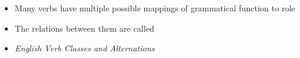 \documentclass[a4paper,landscape,headrule,footrule,xetex]{foils}
\begin{document}


\begin{itemize}
\item  Many verbs have multiple possible mappings of grammatical function to role
  \begin{exe}
    \ex
    \begin{xlist}
      \ex{}
      \ex{}
      \ex{}
    \end{xlist}
    \ex
    \begin{xlist}
      \ex{}
      \ex{}
    \end{xlist}
  \end{exe}  
\item  The relations between them are called 
\item  \textit{English Verb Classes and Alternations} \citep{Levin:1993}
\end{itemize}
\end{document}
